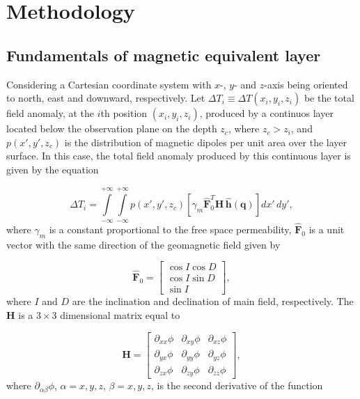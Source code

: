 \section{Methodology}
\label{sec:methodology}

\subsection{Fundamentals of magnetic equivalent layer}
\label{subsec:mag_eqlayer}

Considering a Cartesian coordinate system with $x$-, $y$- and $z$-axis being oriented to north, east and downward, respectively. Let $\Delta T_i \equiv \Delta T (x_i,y_i,z_i)$ be the total field anomaly, at the $i$th position $(x_i,y_i,z_i)$, produced by a continuos layer located below the observation plane on the depth $z_c$, where $z_c > z_i$, and $p(x',y',z_c)$ is the distribution of magnetic dipoles per unit area over the layer surface. In this case, the total field anomaly produced by this continuous layer is given by the equation 

\begin{equation}
\Delta T_i = \int \limits_{-\infty}^{+\infty } \int \limits_{-\infty}^{+\infty }  p(x',y',z_c)  [\gamma_m \hat{\mathbf{F}}_0^T \mathbf{H} \,\hat{\mathbf{h}}(\mathbf{q})] dx' \,dy',
\label{eq:continuous_layer}
\end{equation}
where $\gamma_m$ is a constant proportional to the free space permeability, $\hat{\mathbf{F}}_0$ is a unit vector with the same direction of the geomagnetic field given by

\begin{equation}
	\hat{\mathbf{F}}_0 =
	\left[ \begin{array}{c}
		 \cos I \cos D \\
		 \cos I \sin D \\
		 \sin I     
	\end{array} \right] ,
	\label{eq:main_field}
\end{equation}
where $I$ and $D$ are the inclination and declination of main field, respectively. The $\mathbf{H}$ is a $3 \times 3$ dimensional matrix equal to  

 \begin{equation}
   \mathbf{H} =
   \left[ \begin{array}{ccc}
   \partial_{xx} \phi & \partial_{xy} \phi &\partial_{xz} \phi \\  \partial_{yx} \phi & \partial_{yy} \phi &\partial_{yz} \phi \\  \partial_{zx} \phi &\partial_{zy}\phi  & \partial_{zz} \phi    
   \end{array} \right] ,
   \label{eq:H}
 \end{equation}
where $\partial_{\alpha \beta}\phi$, $\alpha = x, y, z$, $\beta = x, y, z$, is the second derivative of the function 

